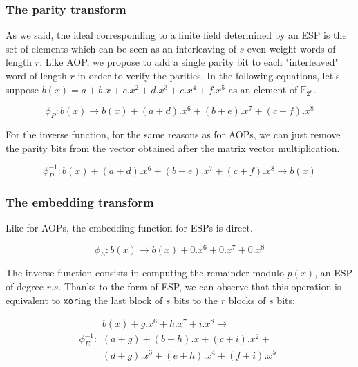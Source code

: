\documentclass[conference]{IEEEtran}
\begin{document}
\subsubsection{The parity transform}

As we said, the ideal corresponding to a finite field determined by an ESP is the set of elements which can be seen as an interleaving of $s$ even weight words of length $r$. Like AOP, we propose to add a single parity bit to each "interleaved" word of length $r$ in order to verify the parities. In the following equations, let's suppose $b(x) = a+b.x+c.x^2+d.x^3+e.x^4+f.x^5$ as an element of $\mathbb{F}_{2^6}$.

	\begin{displaymath}
		\phi_P : b(x) \rightarrow b(x) + (a+d).x^6+(b+e).x^7+(c+f).x^8
	\end{displaymath}

For the inverse function, for the same reasons as for AOPs, we can just remove the parity bits from the vector obtained after the matrix vector multiplication.

	\begin{displaymath}
		\phi_P^{-1} : b(x) + (a+d).x^6+(b+e).x^7+(c+f).x^8 \rightarrow b(x)
	\end{displaymath}

\subsubsection{The embedding transform}

Like for AOPs, the embedding function for ESPs is direct. 

	\begin{displaymath}
		\phi_E : b(x) \rightarrow b(x) + 0.x^6+0.x^7+0.x^8
	\end{displaymath}

The inverse function consists in computing the remainder modulo $p(x)$, an ESP of degree $r.s$. Thanks to the form of ESP, we can observe that this operation is equivalent to \texttt{xor}ing the last block of $s$ bits to the $r$ blocks of $s$ bits:

	\begin{equation*}
	\phi_E^{-1} :  \begin{array}{c}
	b(x) + g.x^6+h.x^7+i.x^8  \rightarrow \\
	(a+g)+(b+h).x+(c+i).x^2+\\
	(d+g).x^3+(e+h).x^4+(f+i).x^5
	\end{array}
	\end{equation*} 
\end{document}
